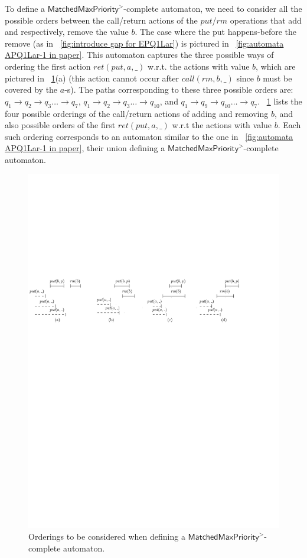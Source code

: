 \documentclass[a4paper,UKenglish]{lipics-v2016}
\begin{document}
To define a $\mathsf{MatchedMaxPriority}^>$-complete automaton, we need to consider all the possible orders between the call/return actions of the $\textit{put}$/$\textit{rm}$ operations that add and respectively, remove the value $b$. The case where the put happens-before the remove (as in \figurename~\ref{fig:introduce gap for EPQ1Lar}) is pictured in \figurename~\ref{fig:automata APQ1Lar-1 in paper}. This automaton captures the three possible ways of ordering the first action $\textit{ret}(\textit{put},a,\_)$ w.r.t. the actions with value $b$, which are pictured in \figurename~\ref{fig:executions APQ1Lar-1 in paper}(a) (this action cannot occur after $\textit{call}(\textit{rm},b,\_)$ since $b$ must be covered by the $a$-s). The paths corresponding to these three possible orders are: $q_1 \rightarrow q_2 \rightarrow q_3 \ldots \rightarrow q_7$, $q_1 \rightarrow q_2 \rightarrow q_3 \ldots \rightarrow q_{10}$, and $q_1 \rightarrow q_9 \rightarrow q_{10} \ldots \rightarrow q_7$. \figurename~\ref{fig:executions APQ1Lar-1 in paper} lists the four possible orderings of the call/return actions of adding and removing $b$, and also possible orders of the first $\textit{ret}(\textit{put},a,\_)$ w.r.t the actions with value $b$. Each such ordering corresponds to an automaton similar to the one in \figurename~\ref{fig:automata APQ1Lar-1 in paper}, their union defining a $\mathsf{MatchedMaxPriority}^>$-complete automaton.




\begin{figure}[t]
  \centering
  \includegraphics[width=.8\textwidth]{PIC_HIS_PQ1Lar-fouCase.pdf}
  \caption{Orderings to be considered when defining a $\mathsf{MatchedMaxPriority}^>$-complete automaton.}
  \label{fig:executions APQ1Lar-1 in paper}
\end{figure}
\end{document}
